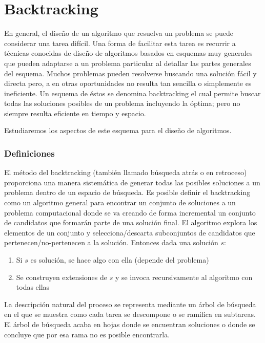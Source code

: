\newpage
\part{Backtracking}
\setcounter{section}{0}

En general, el diseño de un algoritmo que resuelva un problema se puede considerar una tarea difícil. Una forma de facilitar esta tarea es recurrir a técnicas conocidas de diseño de algoritmos basados en esquemas muy generales que pueden adaptarse a un problema particular al detallar las partes generales del esquema. Muchos problemas pueden resolverse buscando una solución fácil y directa pero, a en otras oportunidades no resulta tan sencilla o simplemente es ineficiente. Un esquema de éstos se denomina backtracking el cual permite buscar todas las soluciones posibles de un problema incluyendo la óptima; pero no siempre resulta eficiente en tiempo y espacio.

Estudiaremos los aspectos de este esquema para el diseño de algoritmos.


\section{Definiciones}

El método del backtracking (también llamado búsqueda atrás o en retroceso) proporciona una manera sistemática de generar todas las posibles soluciones a un problema dentro de un espacio de búsqueda. Es posible definir el backtracking como un algoritmo general para encontrar un conjunto de soluciones a un problema computacional donde se va creando de forma incremental un conjunto de candidatos que formarán parte de una solución final. El algoritmo explora los elementos de un conjunto y selecciona/descarta subconjuntos de candidatos que pertenecen/no-pertenecen a la solución. Entonces dada una solución $s$:
\begin{enumerate}
\item Si $s$ es solución, se hace algo con ella (depende del problema)
\item Se construyen extensiones de $s$ y se invoca recursivamente al algoritmo con todas ellas
\end{enumerate}
La descripción natural del proceso se representa mediante un árbol de búsqueda en el que se muestra como cada tarea se descompone o se ramifica en subtareas. El árbol de búsqueda acaba en hojas donde se encuentran soluciones o donde se concluye que por esa rama no es posible encontrarla.


